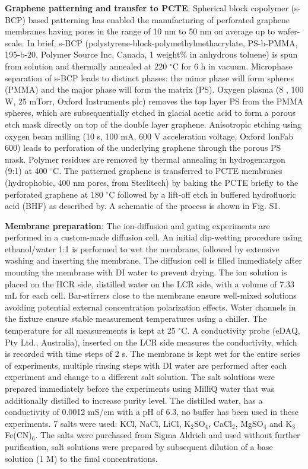 \documentclass[journal=langd5,email=true, hyperref=true, keywords=false]{achemso}
\newcommand{\Fig}{Fig.}
\begin{document}
\vspace{1em}
\noindent
\textbf{Graphene patterning and transfer to PCTE}: Spherical block copolymer
(s-BCP) based patterning has enabled the manufacturing of perforated
graphene membranes having pores in the range of 10 nm to 50 nm on
average up to wafer-scale\cite{Choi_2018}. In brief, s-BCP
(polystyrene-block-polymethylmethacrylate, PS-b-PMMA, 195-b-20,
Polymer Source Inc, Canada, 1 weight\% in anhydrous toluene) is spun
from solution and thermally annealed at 220 $^{\circ}$C for 6 h in
vacuum. Microphase separation of s-BCP leads to distinct phases: the
minor phase will form spheres (PMMA) and the major phase will form the
matrix (PS). Oxygen plasma (8 , 100 W, 25 mTorr, Oxford Instruments
plc) removes the top layer PS from the PMMA spheres, which are
subsequentially etched in glacial acetic acid to form a porous etch
mask directly on top of the double layer graphene. Anisotropic etching
using oxygen beam milling (10 s, 100 mA, 600 V acceleration voltage,
Oxford IonFab 600) leads to perforation of the underlying graphene
through the porous PS mask. Polymer residues are removed by thermal
annealing in hydrogen:argon (9:1) at 400 $^{\circ}$C. The patterned
graphene is transferred to PCTE membranes (hydrophobic, 400 nm pores,
from Sterlitech) by baking the PCTE briefly to the perforated graphene
at 180 $^{\circ}$C followed by a lift-off etch in buffered
hydrofluoric acid (BHF) as described by\cite{Choi_2018}. A schematic
of the process is shown in \Fig{} S1.

\vspace{1em}
\noindent
\textbf{Membrane preparation}: The ion-diffusion and gating experiments are
performed in a custom-made diffusion cell. An initial dip-wetting
procedure using ethanol/water 1:1 is performed to wet the membrane,
followed by extensive washing and inserting the membrane. The
diffusion cell is filled immediately after mounting the membrane with
DI water to prevent drying. The ion solution is placed on the HCR
side, distilled water on the LCR side, with a volume of 7.33 mL for
each cell. Bar-stirrers close to the membrane ensure well-mixed
solutions avoiding potential external concentration polarization
effects. Water channels in the fixture ensure stable measurement
temperatures using a chiller. The temperature for all measurements is
kept at 25 $^{\circ}$C. A conductivity probe (eDAQ, Pty Ltd.,
Australia), inserted on the LCR side measures the conductivity, which
is recorded with time steps of 2 s. The membrane is kept wet for the
entire series of experiments, multiple rinsing steps with DI water are
performed after each experiment and change to a different salt
solution. The salt solutions were prepared immediately before the
experiments using MilliQ water that was additionally distilled to
increase purity level. The distilled water, has a conductivity of
0.0012 mS/cm with a pH of 6.3, no buffer has been used in these
experiments. 7 salts were used: KCl, NaCl, LiCl, K$_{2}$SO$_{4}$,
CaCl$_{2}$, MgSO$_{4}$ and K$_{3}$Fe(CN)$_{6}$. The salts were
purchased from Sigma Aldrich and used without further purification,
salt solutions were prepared by subsequent dilution of a base solution
(1 M) to the final concentrations.
\end{document}
